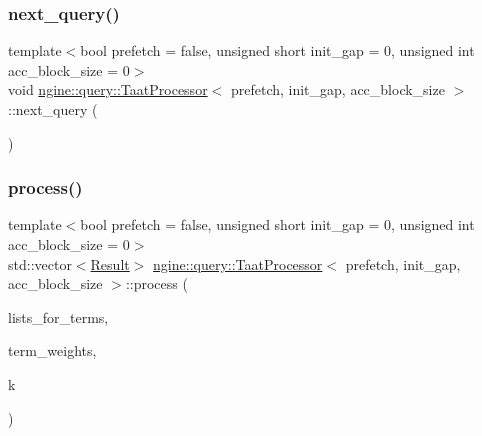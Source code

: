 \subsubsection{\texorpdfstring{next\+\_\+query()}{next\_query()}}
{\footnotesize\ttfamily template$<$bool prefetch = false, unsigned short init\+\_\+gap = 0, unsigned int acc\+\_\+block\+\_\+size = 0$>$ \\
void \hyperlink{classngine_1_1query_1_1TaatProcessor}{ngine\+::query\+::\+Taat\+Processor}$<$ prefetch, init\+\_\+gap, acc\+\_\+block\+\_\+size $>$\+::next\+\_\+query (\begin{DoxyParamCaption}{ }\end{DoxyParamCaption})\hspace{0.3cm}{\ttfamily [inline]}}

\mbox{\label{classngine_1_1query_1_1TaatProcessor_a2e0b564f5d5ff281ef1d693808720382}} 
\subsubsection{\texorpdfstring{process()}{process()}}
{\footnotesize\ttfamily template$<$bool prefetch = false, unsigned short init\+\_\+gap = 0, unsigned int acc\+\_\+block\+\_\+size = 0$>$ \\
std\+::vector$<$\hyperlink{structngine_1_1query_1_1Result}{Result}$>$ \hyperlink{classngine_1_1query_1_1TaatProcessor}{ngine\+::query\+::\+Taat\+Processor}$<$ prefetch, init\+\_\+gap, acc\+\_\+block\+\_\+size $>$\+::process (\begin{DoxyParamCaption}\item[{std\+::vector$<$ \hyperlink{classngine_1_1PostingList}{Posting\+List} $>$ \&}]{lists\+\_\+for\+\_\+terms,  }\item[{const std\+::vector$<$ \hyperlink{structngine_1_1Score}{Score} $>$ \&}]{term\+\_\+weights,  }\item[{std\+::size\+\_\+t}]{k }\end{DoxyParamCaption})\hspace{0.3cm}{\ttfamily [inline]}}

\mbox{\label{classngine_1_1query_1_1TaatProcessor_ac1bb007d7ea3547da5f2775ae8523263}} 
